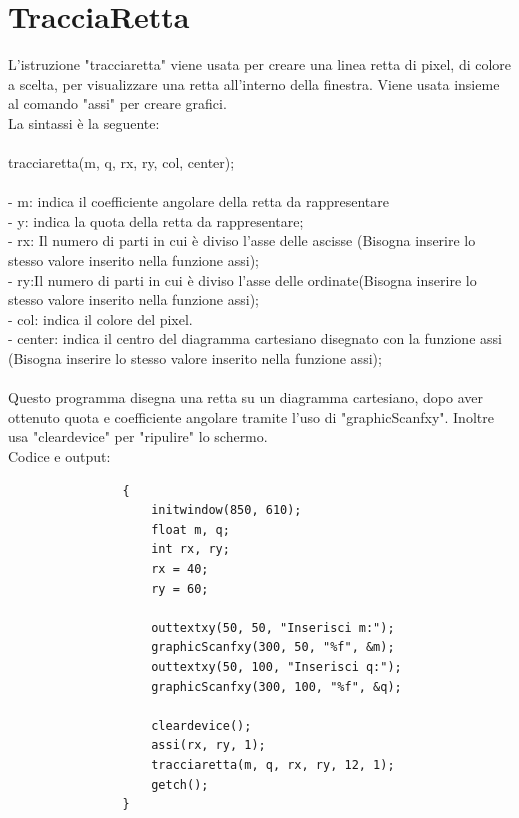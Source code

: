 \documentclass[12pt]{book}
\begin{document}
		\section{TracciaRetta}
			L'istruzione "tracciaretta" viene usata per creare una linea retta di pixel, di colore a scelta, per visualizzare una retta all'interno della finestra. Viene usata insieme al comando "assi" per creare grafici.
			\\La sintassi è la seguente:
			\\
			\\
			\Large tracciaretta(m, q, rx, ry, col, center);
			\normalsize
			\\
			\\- m: indica il coefficiente angolare della retta da rappresentare
			\\- y: indica la quota della retta da rappresentare;
			\\- rx: Il numero di parti in cui è diviso l'asse delle ascisse (Bisogna inserire lo stesso valore inserito nella funzione assi);
			\\- ry:Il numero di parti in cui è diviso l'asse delle ordinate(Bisogna inserire lo stesso valore inserito nella funzione assi);
			\\- col: indica il colore del pixel.
			\\- center: indica il centro del diagramma cartesiano disegnato con la funzione assi (Bisogna inserire lo stesso valore inserito nella funzione assi);
			\\
			\\Questo programma disegna una retta su un diagramma cartesiano, dopo aver ottenuto quota e coefficiente angolare tramite l'uso di "graphicScanfxy". Inoltre usa "cleardevice" per "ripulire" lo schermo.
			\\Codice e output:			
			\begin{lstlisting}
				{
					initwindow(850, 610);
					float m, q;
					int rx, ry;
					rx = 40;
					ry = 60;

					outtextxy(50, 50, "Inserisci m:");
					graphicScanfxy(300, 50, "%f", &m);
					outtextxy(50, 100, "Inserisci q:");
					graphicScanfxy(300, 100, "%f", &q);

					cleardevice();
					assi(rx, ry, 1);
					tracciaretta(m, q, rx, ry, 12, 1);
					getch();
				}
			\end{lstlisting}
\end{document}
